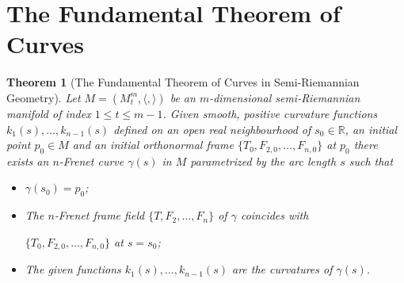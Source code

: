 \documentclass[11pt]{amsart}
\theoremstyle{plain}
\newtheorem{theorem}                {Theorem}      [section]
\theoremstyle{definition}
\numberwithin{equation}{section}
\def \R{{\mathbb R}}
\begin{document}
\appendix
\section{The Fundamental Theorem of Curves}\label{appendix}

\begin{theorem}[The Fundamental Theorem of Curves in Semi-Riemannian Geometry]
Let $M=(M^m_t,\langle, \rangle)$ be an $m$-dimensional semi-Riemannian manifold of index $1 \leq t \leq m-1$. Given smooth, positive curvature functions $k_1(s),\ldots,k_{n-1}(s)$ defined on an open real neighbourhood of $s_0\in \R$, an initial point $p_0\in M$ and an initial orthonormal frame $\{T_0,F_{2,0},\ldots,F_{n,0}\}$ at $p_0$ there exists an $n$-Frenet curve $\gamma(s)$ in $M$ parametrized by the arc length $s$ such that
\begin{itemize}
\item[(i)] $\gamma(s_0)=p_0$;
\item[(ii)] The $n$-Frenet frame field $\{T,F_{2},\ldots,F_{n}\}$ of $\gamma$ coincides with 

\noindent $\{T_0,F_{2,0},\ldots,F_{n,0}\}$ at $s=s_0$;
\item[(iii)] The given functions $k_1(s),\ldots,k_{n-1}(s)$ are the curvatures of $\gamma(s)$.
\end{itemize}
\end{theorem}
\end{document}
